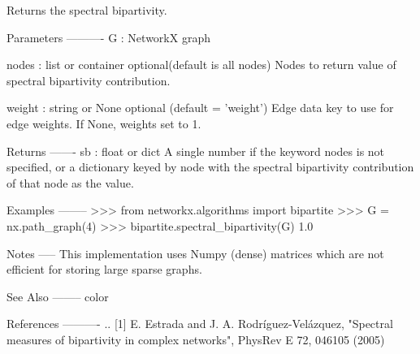 \begin{DoxyVerb}Returns the spectral bipartivity.

Parameters
----------
G : NetworkX graph

nodes : list or container  optional(default is all nodes)
  Nodes to return value of spectral bipartivity contribution.

weight : string or None  optional (default = 'weight')
  Edge data key to use for edge weights. If None, weights set to 1.

Returns
-------
sb : float or dict
   A single number if the keyword nodes is not specified, or
   a dictionary keyed by node with the spectral bipartivity contribution
   of that node as the value.

Examples
--------
>>> from networkx.algorithms import bipartite
>>> G = nx.path_graph(4)
>>> bipartite.spectral_bipartivity(G)
1.0

Notes
-----
This implementation uses Numpy (dense) matrices which are not efficient
for storing large sparse graphs.

See Also
--------
color

References
----------
.. [1] E. Estrada and J. A. Rodríguez-Velázquez, "Spectral measures of
   bipartivity in complex networks", PhysRev E 72, 046105 (2005)
\end{DoxyVerb}
 